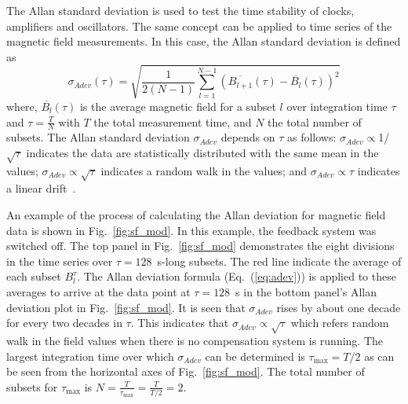 The Allan standard deviation \cite{allan} is used to test the time stability of clocks, amplifiers and oscillators. The same concept can be applied to time series of the magnetic field measurements. In this case, the Allan standard deviation is defined as~\cite{bea}
\begin{equation}\label{eq:adev}
    \sigma_{Adev} (\tau)=\sqrt{\frac{1}{2(N-1)}\sum_{l=1}^{N-1} \left(\overline{B_{l+1}}(\tau)-\overline{B_l}(\tau)\right)^2}
\end{equation}
where, $\overline{B_l}(\tau)$ is the average magnetic field for a subset $l$ over integration time $\tau$ and $\tau = \frac{T}{N}$ with $T$ the total measurement time, and $N$ the total number of subsets. The Allan standard deviation $\sigma_{Adev}$ depends on $\tau$ as follows: $\sigma_{Adev}\propto$1/$\sqrt{\tau}$ indicates the data are statistically distributed with the same mean in the values; $\sigma_{Adev}\propto \sqrt{\tau}$ indicates a random walk in the values; and $\sigma_{Adev}\propto\tau$ indicates a linear drift~\cite{allan_tau}. 



An example of the process of calculating the Allan deviation for magnetic field data is shown in Fig.~\ref{fig:sf_mod}. In this example, the feedback system was switched off. The top panel in Fig.~\ref{fig:sf_mod} demonstrates the eight divisions in the time series over $\tau=128$~s-long subsets. The red line indicate the average of each subset $B_l^{\tau}$. The Allan deviation formula (Eq.~(\ref{eq:adev})) is applied to these averages to arrive at the data point at $\tau=128$~s in the bottom panel's Allan deviation plot in Fig.~\ref{fig:sf_mod}.  It is seen that $\sigma_{Adev}$ rises by about one decade for every two decades in $\tau$. This indicates that $\sigma_{Adev}\propto \sqrt{\tau}$ which refers random walk in the field values when there is no compensation system is running. The largest integration time over which $\sigma_{Adev}$ can be determined is $\tau_{\text{max}}=T/2$ as can be seen from the horizontal axes of Fig.~\ref{fig:sf_mod}. The total number of subsets for $\tau_{\text{max}}$ is $N = \frac{T}{\tau_{\text{max}}}=\frac{T}{T/2}=2$. 

